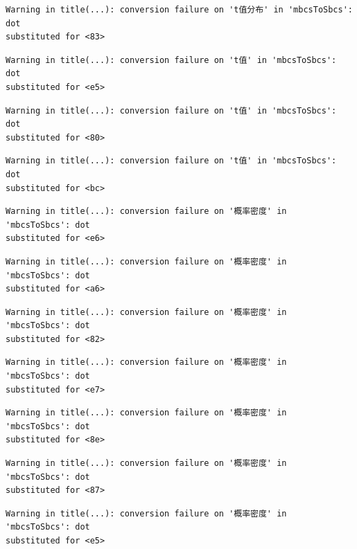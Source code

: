 \documentclass[
  letterpaper,
  DIV=11,
  numbers=noendperiod]{scrreprt}
\begin{document}
\begin{verbatim}
Warning in title(...): conversion failure on 't值分布' in 'mbcsToSbcs': dot
substituted for <83>
\end{verbatim}

\begin{verbatim}
Warning in title(...): conversion failure on 't值' in 'mbcsToSbcs': dot
substituted for <e5>
\end{verbatim}

\begin{verbatim}
Warning in title(...): conversion failure on 't值' in 'mbcsToSbcs': dot
substituted for <80>
\end{verbatim}

\begin{verbatim}
Warning in title(...): conversion failure on 't值' in 'mbcsToSbcs': dot
substituted for <bc>
\end{verbatim}

\begin{verbatim}
Warning in title(...): conversion failure on '概率密度' in 'mbcsToSbcs': dot
substituted for <e6>
\end{verbatim}

\begin{verbatim}
Warning in title(...): conversion failure on '概率密度' in 'mbcsToSbcs': dot
substituted for <a6>
\end{verbatim}

\begin{verbatim}
Warning in title(...): conversion failure on '概率密度' in 'mbcsToSbcs': dot
substituted for <82>
\end{verbatim}

\begin{verbatim}
Warning in title(...): conversion failure on '概率密度' in 'mbcsToSbcs': dot
substituted for <e7>
\end{verbatim}

\begin{verbatim}
Warning in title(...): conversion failure on '概率密度' in 'mbcsToSbcs': dot
substituted for <8e>
\end{verbatim}

\begin{verbatim}
Warning in title(...): conversion failure on '概率密度' in 'mbcsToSbcs': dot
substituted for <87>
\end{verbatim}

\begin{verbatim}
Warning in title(...): conversion failure on '概率密度' in 'mbcsToSbcs': dot
substituted for <e5>
\end{verbatim}
\end{document}
